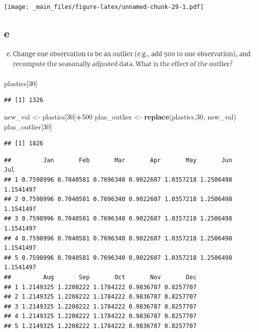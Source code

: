 \documentclass[]{book}
\newenvironment{Shaded}{\begin{snugshade}}{\end{snugshade}}
\newcommand{\DataTypeTok}[1]{\textcolor[rgb]{0.13,0.29,0.53}{#1}}
\newcommand{\DecValTok}[1]{\textcolor[rgb]{0.00,0.00,0.81}{#1}}
\newcommand{\KeywordTok}[1]{\textcolor[rgb]{0.13,0.29,0.53}{\textbf{#1}}}
\newcommand{\NormalTok}[1]{#1}
\newcommand{\OperatorTok}[1]{\textcolor[rgb]{0.81,0.36,0.00}{\textbf{#1}}}
\newcommand{\StringTok}[1]{\textcolor[rgb]{0.31,0.60,0.02}{#1}}
\begin{document}
\texttt{[image: \_main\_files/figure-latex/unnamed-chunk-29-1.pdf]}

\hypertarget{e-1}{%
\subsection{e}\label{e-1}}

\includegraphics{./week2/6.2e.png}

\begin{Shaded}
\begin{Highlighting}[]
\NormalTok{plastics[}\DecValTok{30}\NormalTok{]}
\end{Highlighting}
\end{Shaded}

\begin{verbatim}
## [1] 1326
\end{verbatim}

\begin{Shaded}
\begin{Highlighting}[]
\NormalTok{new_val <-}\StringTok{ }\NormalTok{plastics[}\DecValTok{30}\NormalTok{]}\OperatorTok{+}\DecValTok{500}
\NormalTok{plas_outlier <-}\StringTok{ }\KeywordTok{replace}\NormalTok{(plastics,}\DecValTok{30}\NormalTok{, new_val)}
\NormalTok{plas_outlier[}\DecValTok{30}\NormalTok{]}
\end{Highlighting}
\end{Shaded}

\begin{verbatim}
## [1] 1826
\end{verbatim}

\begin{Shaded}
\end{Shaded}

\begin{verbatim}
##         Jan       Feb       Mar       Apr       May       Jun       Jul
## 1 0.7598996 0.7040581 0.7696340 0.9022607 1.0357218 1.2506498 1.1541497
## 2 0.7598996 0.7040581 0.7696340 0.9022607 1.0357218 1.2506498 1.1541497
## 3 0.7598996 0.7040581 0.7696340 0.9022607 1.0357218 1.2506498 1.1541497
## 4 0.7598996 0.7040581 0.7696340 0.9022607 1.0357218 1.2506498 1.1541497
## 5 0.7598996 0.7040581 0.7696340 0.9022607 1.0357218 1.2506498 1.1541497
##         Aug       Sep       Oct       Nov       Dec
## 1 1.2149325 1.2208222 1.1784222 0.9836787 0.8257707
## 2 1.2149325 1.2208222 1.1784222 0.9836787 0.8257707
## 3 1.2149325 1.2208222 1.1784222 0.9836787 0.8257707
## 4 1.2149325 1.2208222 1.1784222 0.9836787 0.8257707
## 5 1.2149325 1.2208222 1.1784222 0.9836787 0.8257707
\end{verbatim}
\end{document}
